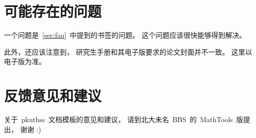 	\section{可能存在的问题}

	一个问题是~\ref{sec:faq}~中提到的书签的问题。
	这个问题应该很快能够得到解决。

	此外，还应该注意到，
	研究生手册\supercite{F13}和其电子版要求的论文封面并不一致。
	这里以电子版为准。

	\section{反馈意见和建议}

	关于~pkuthss~文档模板的意见和建议，
	请到北大未名~BBS~的~MathTools~版提出，
	谢谢 :)

